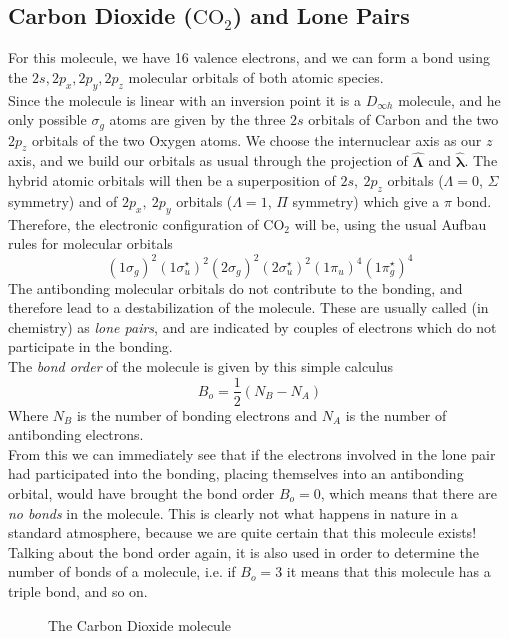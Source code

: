 \documentclass[a4paper, 11pt]{book}
\renewcommand{\vec}[1]{\mathbf{#1}}
\newcommand{\1}{\opr{\mathds{1}}}
\newcommand{\opr}[1]{\hat{#1}}
\newcommand{\vecopr}[1]{\opr{\vec{#1}}}
\theoremstyle{plain}
\begin{document}
	\subsection{Carbon Dioxide ($\mathrm{CO_2}$) and Lone Pairs}
	For this molecule, we have 16 valence electrons, and we can form a bond using the $2s,2p_x,2p_y,2p_z$ molecular orbitals of both atomic species.\\
	Since the molecule is linear with an inversion point it is a $D_{\infty h}$ molecule, and he only possible $\sigma_g$ atoms are given by the three $2s$ orbitals of Carbon and the two $2p_z$ orbitals of the two Oxygen atoms. We choose the internuclear axis as our $z$ axis, and we build our orbitals as usual through the projection of $\vecopr{\Lambda}$ and $\vecopr{\lambda}$. The hybrid atomic orbitals will then be a superposition of $2s,\ 2p_z$ orbitals ($\Lambda=0$, $\Sigma$ symmetry) and of $2p_x,\ 2p_y$ orbitals ($\Lambda=1$, $\Pi$ symmetry) which give a $\pi$ bond.\\
	Therefore, the electronic configuration of $\mathrm{CO_2}$ will be, using the usual Aufbau rules for molecular orbitals
	\begin{equation}
		(1\sigma_g)^2(1\sigma_u^{\star})^2(2\sigma_g)^2(2\sigma_u^{\star})^2(1\pi_u)^4(1\pi_g^{\star})^4
		\label{eq:co2configuration}
	\end{equation}
	The antibonding molecular orbitals do not contribute to the bonding, and therefore lead to a destabilization of the molecule. These are usually called (in chemistry) as \textit{lone pairs}, and are indicated by couples of electrons which do not participate in the bonding.\\
	The \textit{bond order} of the molecule is given by this simple calculus
	\begin{equation}
		B_o=\frac{1}{2}\left( N_B-N_A \right)
		\label{eq:bondorder}
	\end{equation}
	Where $N_B$ is the number of bonding electrons and $N_A$ is the number of antibonding electrons.\\
	From this we can immediately see that if the electrons involved in the lone pair had participated into the bonding, placing themselves into an antibonding orbital, would have brought the bond order $B_o=0$, which means that there are \textit{no bonds} in the molecule. This is clearly not what happens in nature in a standard atmosphere, because we are quite certain that this molecule exists!\\
	Talking about the bond order again, it is also used in order to determine the number of bonds of a molecule, i.e. if $B_o=3$ it means that this molecule has a triple bond, and so on.
	\begin{figure}[H]
		\centering
		\caption{The Carbon Dioxide molecule}
		\label{fig:co2}
	\end{figure}
\end{document}
